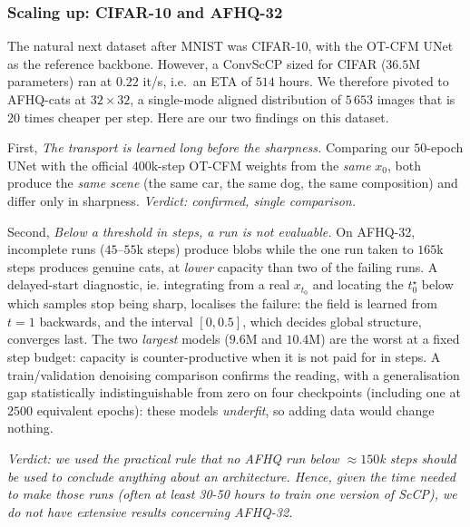 \documentclass[a4paper,11pt]{article}
\theoremstyle{plain}{\theorembodyfont{\rmfamily}%
\newtheorem{proposition}[theorem]{Proposition}}
\theoremstyle{plain}{\theorembodyfont{\rmfamily}%
\newtheorem{notation}[theorem]{Notation}}
\theoremstyle{plain}{\theorembodyfont{\rmfamily}%
\newtheorem{assumption}[theorem]{Assumption}}
\theoremstyle{plain}{\theorembodyfont{\rmfamily}%
\newtheorem{problem}[theorem]{Problem}}
\theoremstyle{plain}{\theorembodyfont{\rmfamily}%
\newtheorem{example}[theorem]{Example}}
\theoremstyle{plain}{\theorembodyfont{\rmfamily}%
\newtheorem{remark}[theorem]{Remark}}
\theoremstyle{plain}{\theorembodyfont{\rmfamily}%
\newtheorem{definition}[theorem]{Definition}}
\theoremstyle{plain}{\theorembodyfont{\rmfamily}%
\newtheorem{question}[theorem]{Question}}
\numberwithin{equation}{section}
\begin{document}
\subsubsection{Scaling up: CIFAR-10 and AFHQ-32}
\label{subsec:scaling}

The natural next dataset after MNIST was CIFAR-10, with the OT-CFM UNet
\cite{tong2024improving} as the reference backbone. However, a ConvScCP sized for
CIFAR ($36.5$M parameters) ran at $0.22$ it/s, i.e.\ an ETA of $514$ hours.  We therefore pivoted to AFHQ-cats at $32\times32$, a single-mode aligned distribution of $5\,653$ images that is $20$ times cheaper per step. Here are our two findings on this dataset.

First, \emph{The transport is learned long before the sharpness.} Comparing our
$50$-epoch UNet with the official $400$k-step OT-CFM weights from the \emph{same}
$x_0$, both produce the \emph{same scene} (the same car, the same dog, the same
composition) and differ only in sharpness. \emph{Verdict: confirmed, single comparison.}

Second, \emph{Below a threshold in steps, a run is not evaluable.} On AFHQ-32, incomplete runs ($45$--$55$k steps) produce blobs
while the one run taken to $165$k steps produces genuine cats, at \emph{lower}
capacity than two of the failing runs. A delayed-start diagnostic, ie. integrating
from a real $x_{t_0}$ and locating the $t_0^\star$ below which samples stop being
sharp, localises the failure: the field is learned from $t=1$ backwards, and the
interval $[0,0.5]$, which decides global structure, converges last. The two
\emph{largest} models ($9.6$M and $10.4$M) are the worst at a fixed step budget:
capacity is counter-productive when it is not paid for in steps. A
train/validation denoising comparison confirms the reading, with a generalisation
gap statistically indistinguishable from zero on four checkpoints (including one at
$2500$ equivalent epochs): these models \emph{underfit}, so adding data would change
nothing. 

\emph{Verdict: we used the practical rule that no AFHQ run below
$\approx150$k steps should be used to conclude anything about an architecture. Hence, given the time needed to make those runs (often at least 30-50 hours to train one version of ScCP), we do not have extensive results concerning AFHQ-32.}
\end{document}
